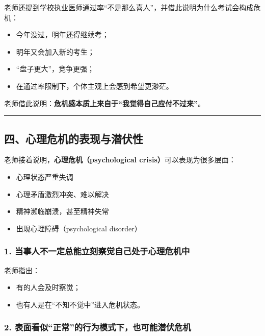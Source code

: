 \documentclass[
  chinese,
  9pt,
  a4paper,
]{ctexart}
\providecommand{\tightlist}{%
  \setlength{\itemsep}{0pt}\setlength{\parskip}{0pt}}
\begin{document}
老师还提到学校执业医师通过率``不是那么喜人''，并借此说明为什么考试会构成危机：

\begin{itemize}
\tightlist
\item
  今年没过，明年还得继续考；
\item
  明年又会加入新的考生；
\item
  ``盘子更大''，竞争更强；
\item
  在通过率限制下，个体主观上会感到希望更渺茫。
\end{itemize}

老师借此说明：\textbf{危机感本质上来自于``我觉得自己应付不过来''}。

\begin{center}\rule{0.5\linewidth}{0.5pt}\end{center}

\subsection{四、心理危机的表现与潜伏性}\label{ux56dbux5fc3ux7406ux5371ux673aux7684ux8868ux73b0ux4e0eux6f5cux4f0fux6027}

老师接着说明，\textbf{心理危机（psychological
crisis）}可以表现为很多层面：

\begin{itemize}
\tightlist
\item
  心理状态严重失调
\item
  心理矛盾激烈冲突、难以解决
\item
  精神濒临崩溃，甚至精神失常
\item
  出现心理障碍（psychological disorder）
\end{itemize}

\subsubsection{1.
当事人不一定总能立刻察觉自己处于心理危机中}\label{ux5f53ux4e8bux4ebaux4e0dux4e00ux5b9aux603bux80fdux7acbux523bux5bdfux89c9ux81eaux5df1ux5904ux4e8eux5fc3ux7406ux5371ux673aux4e2d}

老师指出：

\begin{itemize}
\tightlist
\item
  有的人会及时察觉；
\item
  也有人是在``不知不觉中''进入危机状态。
\end{itemize}

\subsubsection{2.
表面看似``正常''的行为模式下，也可能潜伏危机}\label{ux8868ux9762ux770bux4f3cux6b63ux5e38ux7684ux884cux4e3aux6a21ux5f0fux4e0bux4e5fux53efux80fdux6f5cux4f0fux5371ux673a}
\end{document}
